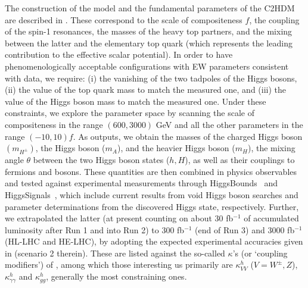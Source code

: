 The construction of the model and the fundamental parameters of the C2HDM are described in . 
These correspond to the scale of compositeness $f$, the coupling of the spin-1 resonances, the masses of the heavy top partners, and the mixing between the latter and the elementary top quark (which represents the leading contribution to the effective scalar potential). 
% 
In order to have phenomenologically acceptable configurations with EW parameters consistent with data, we require: 
(i) the vanishing of the two tadpoles of the \cpeven Higgs bosons, (ii) the value of the top quark mass to match the measured one, 
and (iii) the value of the Higgs boson mass to match the measured one. 
Under these constraints, we explore the parameter space by scanning the scale of compositeness in the range $(600, 3000)$ GeV and all the other parameters in the range $(-10,10)f$.
%
As outputs, we obtain the masses of the charged Higgs boson $(m_{H^\pm})$, the \cpodd Higgs boson ($m_A$), and the heavier \cpeven Higgs boson ($m_H$), 
the mixing angle $\theta$ between the two \cpeven Higgs boson states ($h,H$), as well as their couplings to fermions and bosons. 
These quantities are then combined in physics observables and tested against experimental measurements through HiggsBounds~\cite{Bechtle:2013wla} and HiggsSignals~\cite{Bechtle:2013xfa},
which include {current} results from void Higgs boson searches and parameter determinations from the discovered Higgs state,
respectively. Further, we extrapolated the latter (at present counting on about 30 fb$^{-1}$ of accumulated luminosity after Run 1 and into Run 2) to 300 fb$^{-1}$ (end of Run 3) and 3000 fb$^{-1}$ (HL-LHC and HE-LHC), by adopting the expected experimental accuracies given in   (scenario 2 therein). These are listed against the so-called 
$\kappa$'s (or `coupling modifiers')  of , among which those interesting us primarily are $\kappa_{VV}^h$ ($V=W^\pm,Z$), $\kappa_{\gamma\gamma}^h$ and $\kappa_{gg}^h$, generally the most constraining ones.

